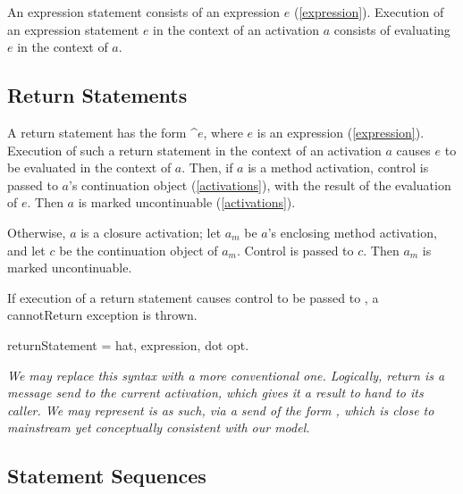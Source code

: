 \documentclass{article}
\newcommand{\code}[1]{{\sf #1}}
\begin{document}
An expression statement consists of an expression $e$  (\ref{expression}). Execution of an expression statement $e$ in the context of an activation $a$ consists of evaluating $e$ in the context of $a$. 


\subsection{Return Statements}
\label{return}

A return statement has the form \^{}$e$, where $e$ is an expression (\ref{expression}). Execution of such a return statement in the context of an activation $a$ causes $e$ to be evaluated in the context of $a$.   Then, if $a$ is a method activation, control is passed to $a$'s continuation object (\ref{activations}), with the result of the evaluation of $e$. Then $a$ is marked uncontinuable (\ref{activations}).

Otherwise, $a$ is a closure activation; let $a_m$ be $a$'s enclosing method activation, and let $c$ be the continuation object of $a_m$.
Control is passed to $c$. Then $a_m$ is marked uncontinuable.

If execution of a return statement causes control to be passed to \NIL{}, a \code{cannotReturn} exception is thrown.

\begin{newspeak}
 returnStatement = hat,  expression, dot opt.
\end{newspeak}

{\it
We may replace this syntax with a more conventional one. Logically, return is a message send to the current activation, which gives it a result to hand to its caller. We may represent is as such, via a send of the form , which is close to mainstream yet conceptually consistent with our model.
}


\subsection{Statement Sequences}
\label{stmtSeq}
\end{document}

